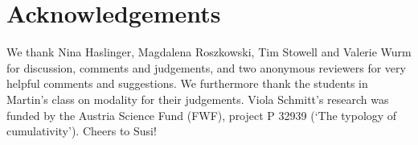 \documentclass[output=paper,colorlinks,citecolor=brown,
]{langscibook}
\begin{document}
\section*{Acknowledgements}
We thank Nina Haslinger, Magdalena Roszkowski, Tim Stowell and Valerie Wurm for discussion, comments and judgements, and two anonymous reviewers for very helpful comments and suggestions. We furthermore thank the students in Martin's class on modality for their judgements. Viola Schmitt's research was funded by the Austria Science Fund (FWF), project  P 32939 (`The typology of cumulativity'). Cheers to Susi!



\printbibliography[heading=subbibliography,notkeyword=this]
\end{document}
